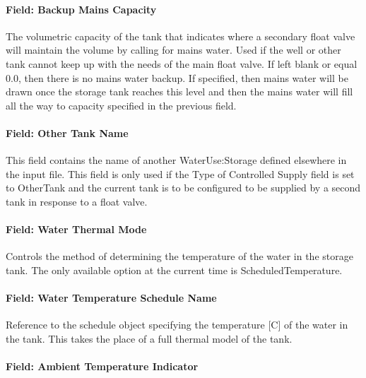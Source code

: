 \paragraph{Field: Backup Mains Capacity}\label{field-backup-mains-capacity}

The volumetric capacity of the tank that indicates where a secondary float valve will maintain the volume by calling for mains water. Used if the well or other tank cannot keep up with the needs of the main float valve. If left blank or equal 0.0, then there is no mains water backup. If specified, then mains water will be drawn once the storage tank reaches this level and then the mains water will fill all the way to capacity specified in the previous field.

\paragraph{Field: Other Tank Name}\label{field-other-tank-name}

This field contains the name of another WaterUse:Storage defined elsewhere in the input file. This field is only used if the Type of Controlled Supply field is set to OtherTank and the current tank is to be configured to be supplied by a second tank in response to a float valve.

\paragraph{Field: Water Thermal Mode}\label{field-water-thermal-mode}

Controls the method of determining the temperature of the water in the storage tank. The only available option at the current time is ScheduledTemperature.

\paragraph{Field: Water Temperature Schedule Name}\label{field-water-temperature-schedule-name-000}

Reference to the schedule object specifying the temperature {[}C{]} of the water in the tank. This takes the place of a full thermal model of the tank.

\paragraph{Field: Ambient Temperature Indicator}\label{field-ambient-temperature-indicator-001}

